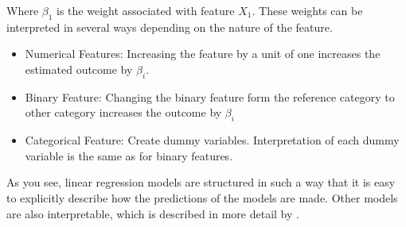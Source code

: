 Where $\beta_1$ is the weight associated with feature $X_1$. These weights can be interpreted in several ways depending on the nature of the feature.

\begin{itemize}
    \item Numerical Features: Increasing the feature by a unit of one increases the estimated outcome by $\beta_i$.
    \item Binary Feature: Changing the binary feature form the reference category to other category increases the outcome by $\beta_i$
    \item Categorical Feature: Create dummy variables. Interpretation of each dummy variable is the same as for binary features.
\end{itemize}

As you see, linear regression models are structured in such a way that it is easy to explicitly describe how the predictions of the models are made. Other models are also interpretable, which is described in more detail by \citet{Molnar:2020:Book}.